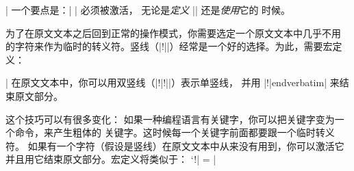 |
一个要点是：|^^M| 必须被激活， 无论是\emph{定义} |\obeywhitespace| 还是\emph{使用}它的
时候。



为了在原文文本之后回到正常的操作模式，你需要选定一个原文文本中几乎不用
的字符来作为临时的转义符。竖线（|!||）经常是一个好的选择。为此，需要宏定
义：
\csdisplay
\def\verbatim{\par\begingroup\deactivate\obeywhitespace
   \catcode `\!| = 0 %
}

\def\endverbatim{\endgroup\endpar}

\def\!|{!|}
|
在原文文本中，你可以用双竖线（|!|!||）表示单竖线，
并用 |!|endverbatim| 来结束原文部分。

这个技巧可以有很多变化：
\ulist
\li 如果一种编程语言有关键字，你可以把关键字变为一个命令，来产生粗体的
关键字。这时候每一个关键字前面都要跟一个临时转义符。
\li 如果有一个字符（假设是竖线）在原文文本中从来没有用到，你可以激活它
并且用它结束原文部分。宏定义将类似于：
\csdisplay
{\catcode `\!| = \active
\gdef\verbatim{%
   \par\begingroup\deactivate\obeywhitespace
   \catcode `!| = \active
   \def !|{\endgroup\par}%
}}
|
\endulist

